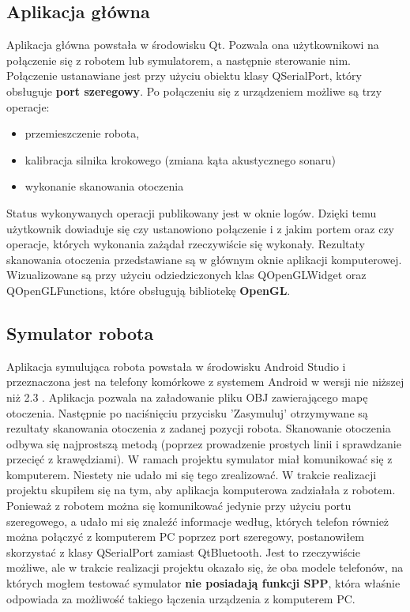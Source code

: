 \documentclass[a4paper,12pt]{article}
\begin{document}
\subsection{Aplikacja główna}
Aplikacja główna powstała w środowisku Qt. Pozwala ona użytkownikowi na połączenie się z robotem lub symulatorem, a następnie sterowanie nim. Połączenie ustanawiane jest przy użyciu obiektu klasy QSerialPort, który obsługuje \textbf{port szeregowy}. Po połączeniu się z urządzeniem możliwe są trzy operacje:
\begin{itemize}
\item przemieszczenie robota,
\item kalibracja silnika krokowego (zmiana kąta akustycznego sonaru)
\item wykonanie skanowania otoczenia
\end{itemize} 
Status wykonywanych operacji publikowany jest w oknie logów. Dzięki temu użytkownik dowiaduje się czy ustanowiono połączenie i z jakim portem oraz czy operacje, których wykonania zażądał rzeczywiście się wykonały.\newline
Rezultaty skanowania otoczenia przedstawiane są w głównym oknie aplikacji komputerowej. Wizualizowane są przy użyciu odziedziczonych klas QOpenGLWidget oraz QOpenGLFunctions, które obsługują bibliotekę \textbf{OpenGL}. \newline

\subsection{Symulator robota}
Aplikacja symulująca robota powstała w środowisku Android Studio i przeznaczona jest na telefony komórkowe z systemem Android w wersji nie niższej niż 2.3 . Aplikacja pozwala na załadowanie pliku OBJ zawierającego mapę otoczenia. Następnie po naciśnięciu przycisku 'Zasymuluj' otrzymywane są rezultaty skanowania otoczenia z zadanej pozycji robota. Skanowanie otoczenia odbywa się najprostszą metodą (poprzez prowadzenie prostych linii i sprawdzanie przecięć z krawędziami). \newline
W ramach projektu symulator miał komunikować się z komputerem. Niestety nie udało mi się tego zrealizować. W trakcie realizacji projektu skupiłem się na tym, aby aplikacja komputerowa zadziałała z robotem. Ponieważ z robotem można się komunikować jedynie przy użyciu portu szeregowego, a udało mi się znaleźć informacje według, których telefon również można połączyć z komputerem PC poprzez port szeregowy, postanowiłem skorzystać z klasy QSerialPort zamiast QtBluetooth. Jest to rzeczywiście możliwe, ale w trakcie realizacji projektu okazało się, że oba modele telefonów, na których mogłem testować symulator \textbf{nie posiadają funkcji SPP}, która właśnie odpowiada za możliwość takiego łączenia urządzenia z komputerem PC. \newline
\end{document}
